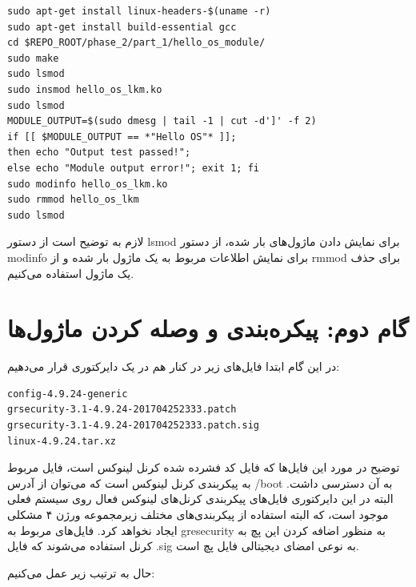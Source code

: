 \documentclass{article}
\begin{document}
\begin{latin}
\begin{verbatim}
sudo apt-get install linux-headers-$(uname -r)
sudo apt-get install build-essential gcc
cd $REPO_ROOT/phase_2/part_1/hello_os_module/
sudo make
sudo lsmod
sudo insmod hello_os_lkm.ko
sudo lsmod
MODULE_OUTPUT=$(sudo dmesg | tail -1 | cut -d']' -f 2)
if [[ $MODULE_OUTPUT == *"Hello OS"* ]];
then echo "Output test passed!";
else echo "Module output error!"; exit 1; fi
sudo modinfo hello_os_lkm.ko
sudo rmmod hello_os_lkm
sudo lsmod
\end{verbatim}
\end{latin}
لازم به توضیح است از دستور lsmod برای نمایش‌ دادن ماژول‌های بار شده، از دستور modinfo برای نمایش اطلاعات مربوط به یک ماژول بار شده و از rmmod برای حذف یک ماژول استفاده می‌کنیم.

\section*{گام دوم: پیکره‌بندی و وصله کردن ماژول‌ها}

در این گام ابتدا فایل‌های زیر در کنار هم در یک دایرکتوری قرار می‌دهیم:

\begin{latin}
\begin{verbatim}
config-4.9.24-generic
grsecurity-3.1-4.9.24-201704252333.patch
grsecurity-3.1-4.9.24-201704252333.patch.sig
linux-4.9.24.tar.xz
\end{verbatim}
\end{latin}
توضیح در مورد این فایل‌‌ها که فایل  کد فشرده شده کرنل لینوکس است، فایل  مربوط به پیکربندی کرنل لینوکس است که می‌توان از آدرس /boot به آن دسترسی داشت. البته در این دایرکتوری فایل‌های پیکربندی کرنل‌های لینوکس فعال روی سیستم فعلی موجود است، که البته استفاده از پیکربندی‌های مختلف زیرمجموعه ورژن ۴ مشکلی ایجاد نخواهد کرد. فایل‌های مربوط به gresecurity به منظور اضافه کردن این پچ به کرنل استفاده می‌شوند که فایل .sig به نوعی امضای دیجیتالی فایل پچ است. 

حال به ترتیب زیر عمل می‌کنیم:
\end{document}
